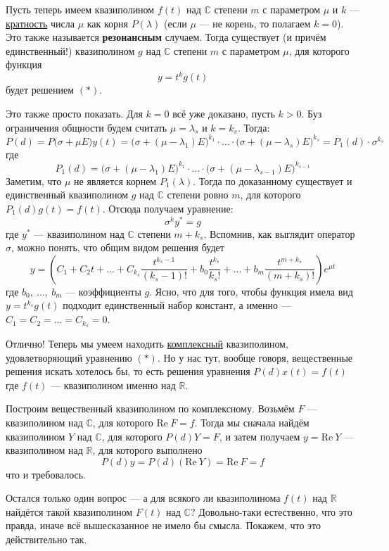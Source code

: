 \documentclass[a4paper,12pt]{article}
\renewcommand{\Re}{\mathrm{Re\:}}
\newcommand{\R}{\mathbb{R}}
\renewcommand{\C}{\mathbb{C}}
\begin{document}
Пусть теперь имеем квазиполином $f(t)$ над $\C$ степени $m$ с параметром $\mu$ и $k$ --- \underline{кратность} числа $\mu$ как корня $P(\lambda)$ (если $\mu$ --- не корень, то полагаем $k = 0$).
Это также называется \textbf{резонансным} случаем.
Тогда существует (и причём единственный!) квазиполином $g$ над $\C$ степени $m$ с параметром $\mu$, для которого функция
\[y = t^kg(t)\]
будет решением $(*)$.

Это также просто показать. 
Для $k = 0$ всё уже доказано, пусть $k > 0$.
Буз ограничения общности будем считать $\mu = \lambda_s$ и $k = k_s$.
Тогда:
\[P(d) = P\big(\sigma + \mu E\big)y(t) = \big(\sigma + (\mu - \lambda_1)E\big)^{k_1} \cdot \ldots \cdot \big(\sigma + (\mu - \lambda_s)E\big)^{k_s} = P_1(d) \cdot \sigma^{k_s}\]
где 
\[P_1(d) = \big(\sigma + (\mu - \lambda_1)E\big)^{k_1} \cdot \ldots \cdot \big(\sigma + (\mu - \lambda_{s - 1})E\big)^{k_{s - 1}}\]
Заметим, что $\mu$ не является корнем $P_1(\lambda)$. 
Тогда по доказанному существует и единственный квазиполином $g$ над $\C$ степени ровно $m$, для которого $P_1(d)g(t) = f(t)$.
Отсюда получаем уравнение:
\[\sigma^ky^* = g\]
где $y^*$ --- квазиполином  над $\C$ степени $m + k_s$.
Вспомнив, как выглядит оператор $\sigma$, можно понять, что общим видом решения будет
\[y = \left(C_1 + C_2t + \ldots + C_{k_s}\dfrac{t^{k_s - 1}}{(k_s - 1)!} + b_0\dfrac{t^{k_s}}{k_s!} + \ldots + b_m\dfrac{t^{m + k_s}}{(m + k_s)!}\right)e^{\mu t}\]
где $b_0,\ \ldots,\ b_m$ --- коэффициенты $g$. 
Ясно, что для того, чтобы функция имела вид $y = t^{k_s}g(t)$ подходит единственный набор констант, а именно --- $C_1 = C_2 = \ldots = C_{k_s} = 0$.

Отлично!
Теперь мы умеем находить \underline{комплексный} квазиполином, удовлетворяющий уравнению $(*)$.
Но у нас тут, вообще говоря, вещественные решения искать хотелось бы, то есть решения уравнения $P(d)x(t) = f(t)$ где $f(t)$ --- квазиполином именно над $\R$.

Построим вещественный квазиполином по комплексному. 
Возьмём $F$ --- квазиполином над $\C$, для которого $\Re F = f$.
Тогда мы сначала найдём квазиполином $Y$ над $\C$, для которого $P(d)Y = F$, и затем получаем $y = \Re Y$ --- квазиполином над $\R$, для которого выполнено
\[P(d)y = P(d)(\Re Y) = \Re F = f\]
что и требовалось.

Остался только один вопрос --- а для всякого ли квазиполинома $f(t)$ над $\R$ найдётся такой квазиполином $F(t)$ над $\C$?
Довольно-таки естественно, что это правда, иначе всё вышесказанное не имело бы смысла.
Покажем, что это действительно так.
\end{document}
